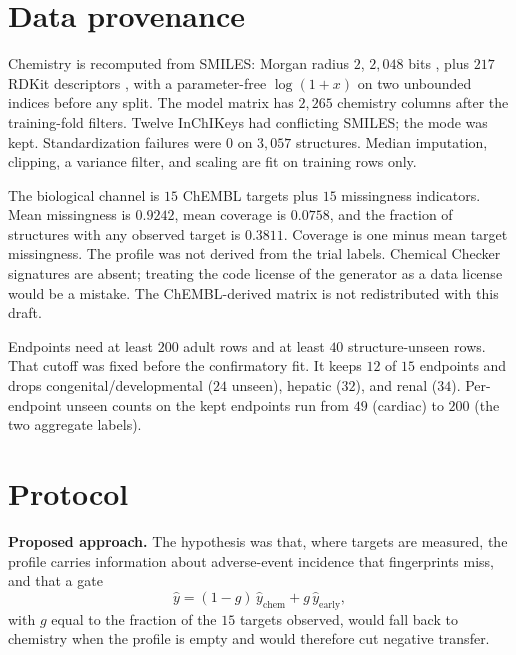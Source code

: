 \documentclass[10pt]{article}
\begin{document}
\section{Data provenance}
\label{sec:data}

Chemistry is recomputed from SMILES: Morgan radius $2$, $2{,}048$ bits \citep{rogers2010ecfp}, plus $217$ RDKit descriptors \citep{rdkit}, with a parameter-free $\log(1+x)$ on two unbounded indices before any split.
The model matrix has $2{,}265$ chemistry columns after the training-fold filters.
Twelve InChIKeys had conflicting SMILES; the mode was kept.
Standardization failures were $0$ on $3{,}057$ structures.
Median imputation, clipping, a variance filter, and scaling are fit on training rows only.

The biological channel is $15$ ChEMBL targets plus $15$ missingness indicators.
Mean missingness is $0.9242$, mean coverage is $0.0758$, and the fraction of structures with any observed target is $0.3811$.
Coverage is one minus mean target missingness.
The profile was not derived from the trial labels.
Chemical Checker signatures are absent; treating the code license of the generator as a data license would be a mistake.
The ChEMBL-derived matrix is not redistributed with this draft.

Endpoints need at least $200$ adult rows and at least $40$ structure-unseen rows.
That cutoff was fixed before the confirmatory fit.
It keeps $12$ of $15$ endpoints and drops congenital/developmental ($24$ unseen), hepatic ($32$), and renal ($34$).
Per-endpoint unseen counts on the kept endpoints run from $49$ (cardiac) to $200$ (the two aggregate labels).

\section{Protocol}
\label{sec:protocol}

\textbf{Proposed approach.}
The hypothesis was that, where targets are measured, the profile carries information about adverse-event incidence that fingerprints miss, and that a gate
\[
\hat y = (1-g)\,\hat y_{\mathrm{chem}} + g\,\hat y_{\mathrm{early}},
\]
with $g$ equal to the fraction of the $15$ targets observed, would fall back to chemistry when the profile is empty and would therefore cut negative transfer.
\end{document}
